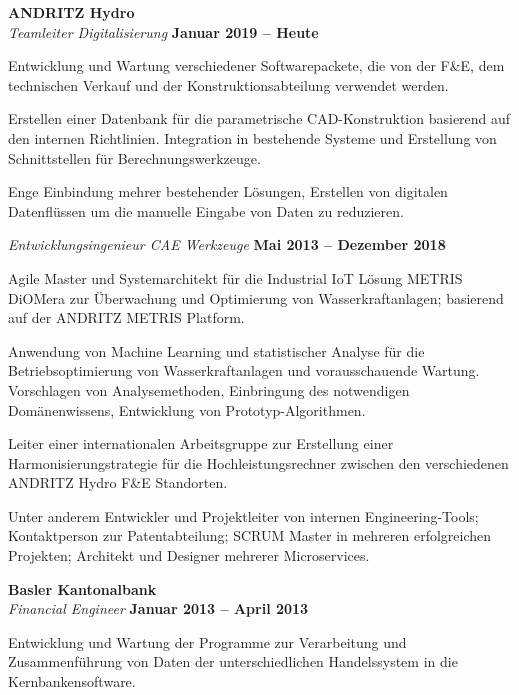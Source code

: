\documentclass[line,11pt,a4paper]{../resume}
\begin{document}
\begin{resume}
\textbf{ANDRITZ Hydro}\\\vspace{1mm}%
\textsl{Teamleiter Digitalisierung} \hfill \textbf{Januar 2019 -- Heute}\\
\vspace{-4mm}%
\begin{list2}
  \item Entwicklung und Wartung verschiedener Softwarepackete, die von der F\&E,
    dem technischen Verkauf und der Konstruktionsabteilung verwendet werden.
  \item Erstellen einer Datenbank für die parametrische CAD-Konstruktion
    basierend auf den internen Richtlinien. Integration in bestehende Systeme
    und Erstellung von Schnittstellen für Berechnungswerkzeuge.
  \item Enge Einbindung mehrer bestehender Lösungen, Erstellen von digitalen
    Datenflüssen um die manuelle Eingabe von Daten zu reduzieren.
\end{list2}

\textsl{Entwicklungsingenieur CAE Werkzeuge} \hfill \textbf{Mai 2013 -- Dezember 2018}\\
\vspace{-4mm}%
\begin{list2}
  \item Agile Master und Systemarchitekt für die Industrial IoT Lösung METRIS
    DiOMera zur Überwachung und Optimierung von Wasserkraftanlagen; basierend
    auf der ANDRITZ METRIS Platform.

  \item Anwendung von Machine Learning und statistischer Analyse für die
    Betriebsoptimierung von Wasserkraftanlagen und vorausschauende Wartung.
    Vorschlagen von Analysemethoden, Einbringung des notwendigen
    Domänenwissens, Entwicklung von Prototyp-Algorithmen.

  \item Leiter einer internationalen Arbeitsgruppe zur Erstellung
    einer Harmonisierungstrategie für die Hochleistungsrechner zwischen den
    verschiedenen ANDRITZ Hydro F\&E Standorten.

  \item Unter anderem Entwickler und Projektleiter von internen
    Engineering-Tools; Kontaktperson zur Patentabteilung; SCRUM Master in
    mehreren erfolgreichen Projekten; Architekt und Designer mehrerer
    Microservices.
\end{list2}

\textbf{Basler Kantonalbank}\\\vspace{1mm}%
\textsl{Financial Engineer} \hfill \textbf{Januar 2013 -- April 2013}\\
\vspace{-4mm}%
\begin{list2}
  \item Entwicklung und Wartung der Programme zur Verarbeitung und
    Zusammenführung von Daten der unterschiedlichen Handelssystem in die
    Kernbankensoftware.
\end{list2}


\end{resume}
\end{document}

